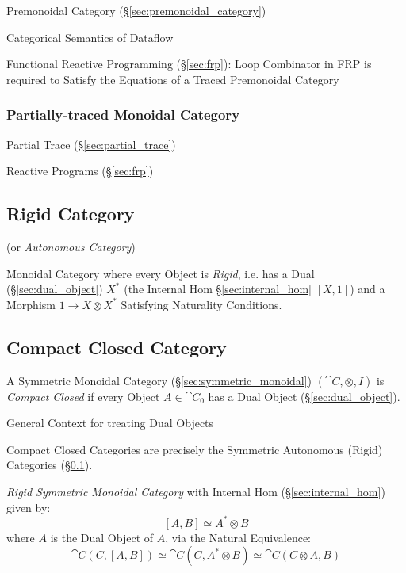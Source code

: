 Premonoidal Category (\S\ref{sec:premonoidal_category})

Categorical Semantics of Dataflow %

Functional Reactive Programming (\S\ref{sec:frp}): Loop Combinator in
FRP is required to Satisfy the Equations of a Traced Premonoidal
Category



\subsubsection{Partially-traced Monoidal Category}
\label{sec:partially_traced}

Partial Trace (\S\ref{sec:partial_trace})

Reactive Programs (\S\ref{sec:frp})



\subsection{Rigid Category}\label{sec:rigid_category}

(or \emph{Autonomous Category})

Monoidal Category where every Object is \emph{Rigid}, i.e. has a Dual
(\S\ref{sec:dual_object}) $X^*$ (the Internal Hom
\S\ref{sec:internal_hom} $[X,1]$) and a Morphism $1 \rightarrow
X \otimes X^*$ Satisfying Naturality Conditions.



\subsection{Compact Closed Category}\label{sec:compact_closed}

A Symmetric Monoidal Category (\S\ref{sec:symmetric_monoidal})
$(\cat{C}, \otimes, I)$ is \emph{Compact Closed} if every Object $A
\in \cat{C}_0$ has a Dual Object (\S\ref{sec:dual_object}).

General Context for treating Dual Objects

Compact Closed Categories are precisely the Symmetric Autonomous
(Rigid) Categories (\S\ref{sec:rigid_category}).

\emph{Rigid Symmetric Monoidal Category} with Internal Hom
(\S\ref{sec:internal_hom}) given by:
\[
  [A,B] \simeq A^* \otimes B
\]
where $A$ is the Dual Object of $A$, via the Natural Equivalence:
\[
  \cat{C}(C,[A,B]) \simeq \cat{C}(C,A^* \otimes B)
    \simeq \cat{C}(C \otimes A, B)
\]

